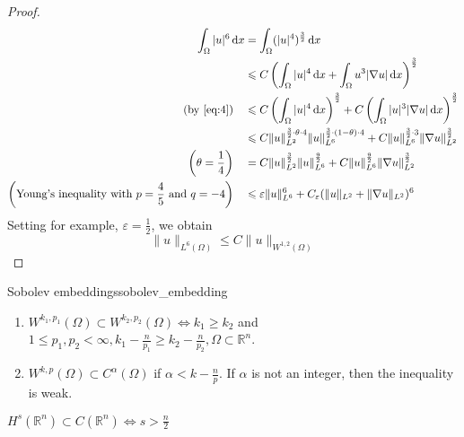 \documentclass{report}
\begin{document}
\begin{proof}
    \begin{align*}
        \int_{\Omega} \vert u \vert^{6} \,\mathrm{d}x &= \int_{\Omega} (\vert u \vert^{4})^{\frac{3}{2}} \,\mathrm{d}x \\
        &\leq C \left(\int_{\Omega} \vert u \vert^{4} \,\mathrm{d}x + \int_{\Omega} u^{3}|\nabla u| \,\mathrm{d}x \right)^{\frac{3}{2}} \\
        (\text{by \eqref{eq:4}}) \quad &\leq C \left(\int_{\Omega} \vert u \vert^{4} \,\mathrm{d}x\right)^{\frac{3}{2}} + C \left(\int_{\Omega} \vert u \vert^{3} \vert \nabla u \vert \,\mathrm{d}x \right)^{\frac{3}{2}} \\
        &\leq C \|u\|^{\frac{3}{2}\cdot \theta \cdot 4}_{L^{2}} \|u\|^{\frac{3}{2}\cdot (1-\theta) \cdot 4}_{L^{6}} + C \|u\|^{\frac{3}{2}\cdot 3}_{L^{6}} \|\nabla u\|^{\frac{3}{2}}_{L^{2}} \\
        \left(\theta = \frac{1}{4}\right) \quad &= C \|u\|^{\frac{3}{2}}_{L^{2}} \|u\|^{\frac{9}{2}}_{L^{6}} + C\|u\|^{\frac{9}{2}}_{L^{6}} \|\nabla u\|^{\frac{3}{2}}_{L^{2}} \\
        \left(\text{Young's inequality with } p=\frac{4}{5} \text{ and }q=-4\right) \quad &\leq \varepsilon \|u\|^{6}_{L^{6}} + C_{\varepsilon}(\|u\|_{L^{2}} + \|\nabla u\|_{L^{2}})^{6}
    \end{align*}
    Setting for example, \(\varepsilon = \frac{1}{2}\), we obtain
    \[\|u\|_{L^{6}(\Omega)} \leq C \|u\|_{W^{1, 2}(\Omega)}\]
\end{proof}

\begin{theorem}{Sobolev embeddings}{sobolev_embedding}
    \begin{enumerate}[label=\bfseries\tiny\protect\circled{\small\arabic*}]
		\item \(W^{k_1, p_1}(\Omega) \subset W^{k_2, p_2}(\Omega) \Longleftrightarrow k_1 \geq k_2\) and \(1 \leq p_1, p_2 < \infty, k_1 - \frac{n}{p_1} \geq k_2 - \frac{n}{p_2}, \Omega \subset \mathbb{R}^{n}\).
		\item \(W^{k,p}(\Omega) \subset C^{\alpha}(\Omega)\) if \(\alpha < k - \frac{n}{p}\). If \(\alpha\) is not an integer, then the inequality is weak.
	\end{enumerate}
\end{theorem}

\begin{example}{}{}
    \(H^{s}(\mathbb{R}^{n}) \subset C(\mathbb{R}^{n}) \iff s > \frac{n}{2}\) 
\end{example}
\end{document}
